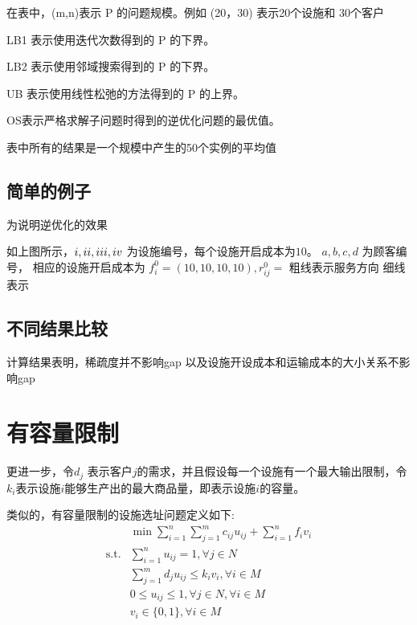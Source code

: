 \documentclass[UTF8]{article}
\begin{document}
在表中，(m,n)表示 P 的问题规模。例如 (20，30) 表示20个设施和 30个客户

LB1 表示使用迭代次数得到的 P 的下界。

LB2 表示使用邻域搜索得到的 P 的下界。

UB  表示使用线性松弛的方法得到的 P 的上界。

OS表示严格求解子问题时得到的逆优化问题的最优值。

表中所有的结果是一个规模中产生的50个实例的平均值

\subsection{简单的例子}

为说明逆优化的效果

如上图所示，$\uppercase\expandafter{\romannumeral1},\uppercase\expandafter{\romannumeral2},\uppercase\expandafter{\romannumeral3},\uppercase\expandafter{\romannumeral4}$ 为设施编号，每个设施开启成本为$10$。
$a,b,c,d$ 为顾客编号，
相应的设施开启成本为 $f_i^0=(10,10,10,10), r_{ij}^0 = $
粗线表示服务方向 细线表示


\subsection{不同结果比较}

计算结果表明，稀疏度并不影响gap
以及设施开设成本和运输成本的大小关系不影响gap

\section{有容量限制}

更进一步，令$d_j$ 表示客户$j$的需求，并且假设每一个设施有一个最大输出限制，令$k_i$表示设施$i$能够生产出的最大商品量，即表示设施$i$的容量。

类似的，有容量限制的设施选址问题定义如下:
\begin{align*}
&\min \sum_{i=1}^n \sum_{j=1}^m c_{ij}u_{ij} + \sum_{i=1}^n f_i v_i \\
\text{s.t.}& \sum_{i=1}^n u_{ij} =1, \forall j \in N  \\
&\sum_{j=1}^m d_j u_{ij}  \leq k_iv_i, \forall i \in M \\
& 0 \leq u_{ij} \leq 1,\forall j \in N, \forall i \in M \\
& v_{i} \in \{0,1\}, \forall i \in M
\end{align*}
\end{document}
